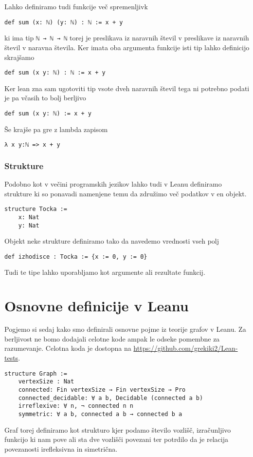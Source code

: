 \documentclass[mat1]{fmfdelo}
\begin{document}
Lahko definiramo tudi funkcije več spremenljivk
\begin{lstlisting}
def sum (x: ℕ) (y: ℕ) : ℕ := x + y
\end{lstlisting}
ki ima tip \lstinline{ℕ → ℕ → ℕ} torej je preslikava iz naravnih števil v preslikave iz naravnih števil v naravna števila.
Ker imata oba argumenta funkcije isti tip lahko definicijo skrajšamo
\begin{lstlisting}
def sum (x y: ℕ) : ℕ := x + y
\end{lstlisting}
Ker lean zna sam ugotoviti tip vsote dveh naravnih števil tega ni potrebno podati je pa včasih to bolj berljivo
\begin{lstlisting}
def sum (x y: ℕ) := x + y
\end{lstlisting}
Še krajše pa gre z lambda zapisom
\begin{lstlisting}
λ x y:ℕ => x + y
\end{lstlisting}

\subsubsection{Strukture}
Podobno kot v večini programskih jezikov lahko tudi v Leanu definiramo strukture ki so ponavadi namenjene temu da združimo več podatkov v en objekt.
\begin{lstlisting}
structure Tocka :=
    x: Nat
    y: Nat
\end{lstlisting}
Objekt neke strukture definiramo tako da navedemo vrednosti vseh polj
\begin{lstlisting}
def izhodisce : Tocka := {x := 0, y := 0}
\end{lstlisting}
Tudi te tipe lahko uporabljamo kot argumente ali rezultate funkcij.




\section{Osnovne definicije v Leanu}
Pogjemo si sedaj kako smo definirali osnovne pojme iz teorije grafov v Leanu.
Za berljivost ne bomo dodajali celotne kode ampak le odseke pomembne za razumevanje.
Celotna koda je dostopna na \url{https://github.com/grekiki2/Lean-tests}.
\begin{lstlisting}
structure Graph :=
    vertexSize : Nat
    connected: Fin vertexSize → Fin vertexSize → Pro
    connected_decidable: ∀ a b, Decidable (connected a b)
    irreflexive: ∀ n, ¬ connected n n
    symmetric: ∀ a b, connected a b → connected b a
\end{lstlisting}
Graf torej definiramo kot strukturo kjer podamo število vozlišč, izračunljivo funkcijo ki nam pove
ali sta dve vozlišči povezani ter potrdilo da je relacija povezanosti irefleksivna in simetrična.
\end{document}
